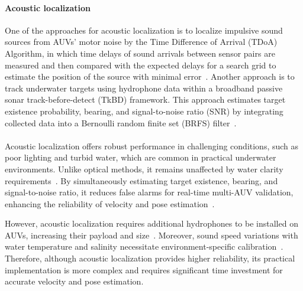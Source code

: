 \documentclass[11pt]{article}
\begin{document}
        \paragraph{Acoustic localization} 
        One of the approaches for acoustic localization is to localize impulsive sound sources from AUVs' motor noise by the Time Difference of Arrival (TDoA) Algorithm, in which time delays of sound arrivals between sensor pairs are measured and then compared with the expected delays for a search grid to estimate the position of the source with minimal error~\cite{mceachern_real-time_2024}. Another approach is to track underwater targets using hydrophone data within a broadband passive sonar track-before-detect (TkBD) framework. This approach estimates target existence probability, bearing, and signal-to-noise ratio (SNR) by integrating collected data into a Bernoulli random finite set (BRFS) filter~\cite{bosser_broadband_2024}.\\\\
        Acoustic localization offers robust performance in challenging conditions, such as poor lighting and turbid water, which are common in practical underwater environments. Unlike optical methods, it remains unaffected by water clarity requirements~\cite{mceachern_real-time_2024}. By simultaneously estimating target existence, bearing, and signal-to-noise ratio, it reduces false alarms for real-time multi-AUV validation, enhancing the reliability of velocity and pose estimation~\cite{bosser_broadband_2024}.

        However, acoustic localization requires additional hydrophones to be installed on AUVs, increasing their payload and size~\cite{bosser_broadband_2024}. Moreover, sound speed variations with water temperature and salinity necessitate environment-specific calibration~\cite{bosser_broadband_2024}. Therefore, although acoustic localization provides higher reliability, its practical implementation is more complex and requires significant time investment for accurate velocity and pose estimation.
\end{document}
